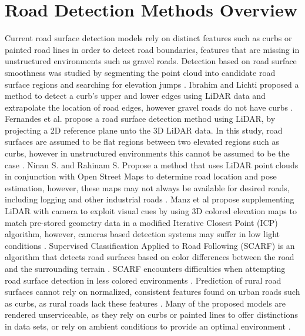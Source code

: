 \documentclass[numbered,pdftex]{ohio-etd}
\begin{document}
{	\section{Road Detection Methods Overview}{
		{Current road surface detection models rely on distinct features such as curbs or painted road lines in order to detect road boundaries, features that are missing in unstructured environments such as gravel roads. Detection based on road surface smoothness was studied by segmenting the point cloud into candidate road surface regions and searching for elevation jumps \cite{liu_new_2013}. Ibrahim and Lichti proposed a method to detect a curb's upper and lower edges using LiDAR data and extrapolate the location of road edges, however gravel roads do not have curbs \cite{ibrahim_curb-based_2012,skorseth_gravel_nodate}. Fernandes et al. propose a road surface detection method using LiDAR, by projecting a 2D reference plane unto the 3D LiDAR data. In this study, road surfaces are assumed to be flat regions between two elevated regions such as curbs, however in unstructured environments this cannot be assumed to be the case \cite{fernandes_road_2014}. Ninan S. and Rahinam S. Propose a method that uses LiDAR point clouds in conjunction with Open Street Maps to determine road location and pose estimation, however, these maps may not always be available for desired roads, including logging and other industrial roads \cite{ninan_road_2022}. Manz et al propose supplementing LiDAR with camera to exploit visual cues by using 3D colored elevation maps to match pre-stored geometry data in a modified Iterative Closest Point (ICP) algorithm, however, cameras based detection systems may suffer in low light conditions \cite{manz_detection_2011}. Supervised Classification Applied to Road Following (SCARF) is an algorithm that detects road surfaces based on color differences between the road and the surrounding terrain \cite{crisman_scarf_1993}. SCARF encounters difficulties when attempting road surface detection in less colored environments \cite{crisman_scarf_1993,manz_detection_2011}. Prediction of rural road surfaces cannot rely on normalized, consistent features found on urban roads such as curbs, as rural roads lack these features \cite{skorseth_gravel_nodate}. Many of the proposed models are rendered unserviceable, as they rely on curbs or painted lines to offer distinctions in data sets, or rely on ambient conditions to provide an optimal environment \cite{yadav_extraction_2017,liu_new_2013,qiu_fast_2016,fernandes_road_2014,seker_experiments_nodate,yang_semi-automated_2013,miyazaki_line-based_2014,hervieu_road_2013,smadja_road_nodate}.} 
		
}}
\end{document}
